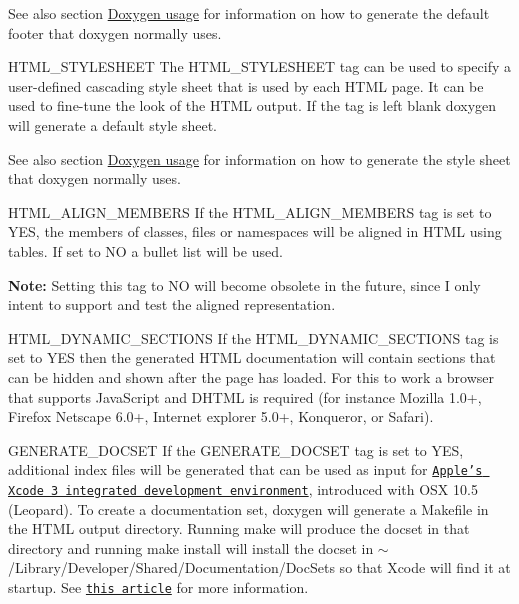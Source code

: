 \begin{DoxyDescription}
See also section \hyperlink{doxygen_usage}{Doxygen usage} for information on how to generate the default footer that doxygen normally uses.

\label{config_cfg_html_stylesheet}
\hypertarget{config_cfg_html_stylesheet}{}
 
\item[{\ttfamily HTML\_\-STYLESHEET} ] The {\ttfamily HTML\_\-STYLESHEET} tag can be used to specify a user-\/defined cascading style sheet that is used by each HTML page. It can be used to fine-\/tune the look of the HTML output. If the tag is left blank doxygen will generate a default style sheet.

See also section \hyperlink{doxygen_usage}{Doxygen usage} for information on how to generate the style sheet that doxygen normally uses.

\label{config_cfg_html_align_members}
\hypertarget{config_cfg_html_align_members}{}
 
\item[{\ttfamily HTML\_\-ALIGN\_\-MEMBERS} ] If the {\ttfamily HTML\_\-ALIGN\_\-MEMBERS} tag is set to {\ttfamily YES}, the members of classes, files or namespaces will be aligned in HTML using tables. If set to {\ttfamily NO} a bullet list will be used.

{\bfseries Note:} Setting this tag to {\ttfamily NO} will become obsolete in the future, since I only intent to support and test the aligned representation.

\label{config_cfg_html_dynamic_sections}
\hypertarget{config_cfg_html_dynamic_sections}{}
 
\item[{\ttfamily HTML\_\-DYNAMIC\_\-SECTIONS} ] If the {\ttfamily HTML\_\-DYNAMIC\_\-SECTIONS} tag is set to {\ttfamily YES} then the generated HTML documentation will contain sections that can be hidden and shown after the page has loaded. For this to work a browser that supports JavaScript and DHTML is required (for instance Mozilla 1.0+, Firefox Netscape 6.0+, Internet explorer 5.0+, Konqueror, or Safari).

\label{config_cfg_generate_docset}
\hypertarget{config_cfg_generate_docset}{}
 
\item[{\ttfamily GENERATE\_\-DOCSET} ] If the {\ttfamily GENERATE\_\-DOCSET} tag is set to {\ttfamily YES}, additional index files will be generated that can be used as input for \href{http://developer.apple.com/tools/xcode/}{\tt Apple's Xcode 3 integrated development environment}, introduced with OSX 10.5 (Leopard). To create a documentation set, doxygen will generate a Makefile in the HTML output directory. Running {\ttfamily make} will produce the docset in that directory and running {\ttfamily make install} will install the docset in {\ttfamily $\sim$/Library/Developer/Shared/Documentation/DocSets} so that Xcode will find it at startup. See \href{http://developer.apple.com/tools/creatingdocsetswithdoxygen.html}{\tt this article} for more information.


\end{DoxyDescription}
